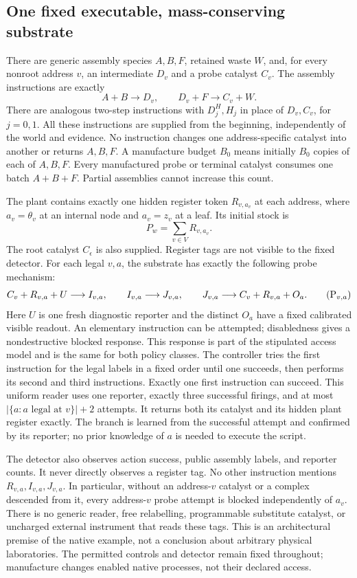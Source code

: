 \documentclass[11pt]{article}
\theoremstyle{definition}
\theoremstyle{remark}
\begin{document}
\subsection{One fixed executable, mass-conserving substrate}
There are generic assembly species $A,B,F$, retained waste $W$, and, for
every nonroot address $v$, an intermediate $D_v$ and a probe catalyst
$C_v$. The assembly instructions are exactly
\[
 A+B\longrightarrow D_v,
 \qquad D_v+F\longrightarrow C_v+W.
\tag{M$_v$}\label{ing:manufacture}
\]
There are analogous two-step instructions with $D^H_j,H_j$ in place of
$D_v,C_v$, for $j=0,1$. All these instructions are supplied from the
beginning, independently of the world and evidence. No instruction
changes one address-specific catalyst into another or returns $A,B,F$.
A manufacture budget $B_0$ means initially $B_0$ copies of each of
$A,B,F$. Every manufactured probe or terminal catalyst consumes one
batch $A+B+F$. Partial assemblies cannot increase this count.

The plant contains exactly one hidden register token $R_{v,a_v}$ at each
address, where $a_v=\theta_v$ at an internal node and $a_v=z_v$ at a leaf.
Its initial stock is
\[
 P_w=\sum_{v\in V}R_{v,a_v}.
\]
The root catalyst $C_\epsilon$ is also supplied. Register tags are not
visible to the fixed detector. For each legal $v,a$, the substrate has
exactly the following probe mechanism:
\[
 C_v+R_{v,a}+U\longrightarrow I_{v,a},\qquad
 I_{v,a}\longrightarrow J_{v,a},\qquad
 J_{v,a}\longrightarrow C_v+R_{v,a}+O_a.
\tag{P$_{v,a}$}\label{ing:probe}
\]
Here $U$ is one fresh diagnostic reporter and the distinct $O_a$ have a
fixed calibrated visible readout. An elementary instruction can be
attempted; disabledness gives a nondestructive blocked response. This
response is part of the stipulated access model and is the same for both
policy classes. The controller tries the first instruction for the legal
labels in a fixed order until one succeeds, then performs its second and
third instructions. Exactly one first instruction can succeed. This
uniform reader uses one reporter, exactly three successful firings, and
at most $|\{a:a\text{ legal at }v\}|+2$ attempts. It returns both its
catalyst and its hidden plant register exactly. The branch is learned
from the successful attempt and confirmed by its reporter; no prior
knowledge of $a$ is needed to execute the script.

The detector also observes action success, public assembly labels, and
reporter counts. It never directly observes a register tag. No other
instruction mentions $R_{v,a},I_{v,a},J_{v,a}$. In particular, without an
address-$v$ catalyst or a complex descended from it, every address-$v$
probe attempt is blocked independently of $a_v$. There is no generic
reader, free relabelling, programmable substitute catalyst, or uncharged
external instrument that reads these tags. This is an architectural
premise of the native example, not a conclusion about arbitrary physical
laboratories. The permitted controls and detector remain fixed throughout;
manufacture changes enabled native processes, not their declared access.
\end{document}
